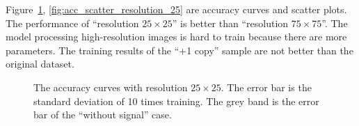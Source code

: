 \documentclass[12pt]{article}
\begin{document}
		Figure~\ref{fig:acc_curve_resolution_25}, \ref{fig:acc_scatter_resolution_25} are accuracy curves and scatter plots. The performance of ``resolution $25\times 25$'' is better than ``resolution $75\times 75$''. The model processing high-resolution images is hard to train because there are more parameters. The training results of the ``+1 copy'' sample are not better than the original dataset.
		\begin{figure}[htpb]
			\centering
			\caption{The accuracy curves with resolution $25\times 25$. The error bar is the standard deviation of 10 times training. The grey band is the error bar of the ``without signal'' case.}
			\label{fig:acc_curve_resolution_25}
		\end{figure}
\end{document}
